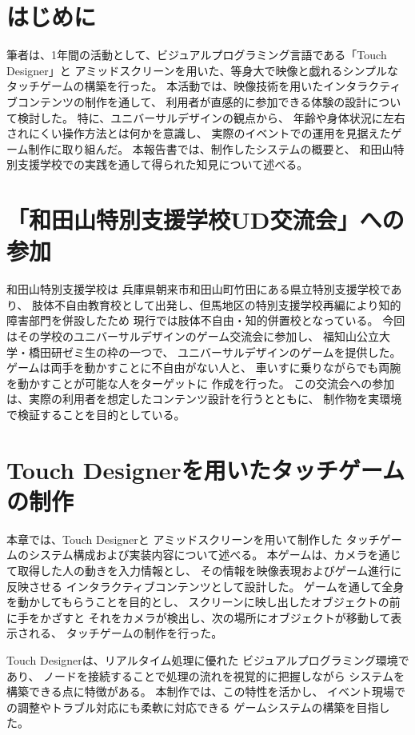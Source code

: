
\section{はじめに}
筆者は、1年間の活動として、ビジュアルプログラミング言語である「Touch Designer」と
アミッドスクリーンを用いた、等身大で映像と戯れるシンプルなタッチゲームの構築を行った。
本活動では、映像技術を用いたインタラクティブコンテンツの制作を通して、
利用者が直感的に参加できる体験の設計について検討した。
特に、ユニバーサルデザイン\cite{universaldesign}の観点から、
年齢や身体状況に左右されにくい操作方法とは何かを意識し、
実際のイベントでの運用を見据えたゲーム制作に取り組んだ。
本報告書では、制作したシステムの概要と、
和田山特別支援学校での実践を通して得られた知見について述べる。
\section{「和田山特別支援学校UD交流会」への参加}
和田山特別支援学校\cite{wadayamaWikipedia}は
兵庫県朝来市和田山町竹田にある県立特別支援学校であり、
肢体不自由教育校として出発し、但馬地区の特別支援学校再編により知的障害部門を併設したため
現行では肢体不自由・知的併置校となっている。
今回はその学校のユニバーサルデザインのゲーム交流会に参加し、
福知山公立大学・橋田研ゼミ生の枠の一つで、
ユニバーサルデザインのゲームを提供した。
ゲームは両手を動かすことに不自由がない人と、
車いすに乗りながらでも両腕を動かすことが可能な人をターゲットに
作成を行った。
この交流会への参加は、実際の利用者を想定したコンテンツ設計を行うとともに、
制作物を実環境で検証することを目的としている。

\section{Touch Designerを用いたタッチゲームの制作}
本章では、Touch Designer\cite{TouchDesignerToha}と
アミッドスクリーン\cite{Amitudosukurintoha}を用いて制作した
タッチゲームのシステム構成および実装内容について述べる。
本ゲームは、カメラを通じて取得した人の動きを入力情報とし、
その情報を映像表現およびゲーム進行に反映させる
インタラクティブコンテンツとして設計した。
ゲームを通して全身を動かしてもらうことを目的とし、
スクリーンに映し出したオブジェクトの前に手をかざすと
それをカメラが検出し、次の場所にオブジェクトが移動して表示される、
タッチゲームの制作を行った。

Touch Designerは、リアルタイム処理に優れた
ビジュアルプログラミング環境であり、
ノードを接続することで処理の流れを視覚的に把握しながら
システムを構築できる点に特徴がある。
本制作では、この特性を活かし、
イベント現場での調整やトラブル対応にも柔軟に対応できる
ゲームシステムの構築を目指した。

